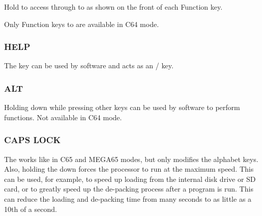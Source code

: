 Hold  to access  through to  as shown on the front of each Function key.

Only Function keys  to  are available in C64 mode.

\subsubsection{HELP}

The  key can be used by software and acts as an  /  key.

\subsubsection{ALT}

Holding  down while pressing other keys can be used by software to perform functions. Not available in C64 mode.

\subsubsection{CAPS LOCK}

The  works like  in C65 and MEGA65 modes, but only modifies the alphabet keys.
Also, holding the  down forces the processor to run at the maximum speed. This can be used, for example,
to speed up loading from the internal disk drive or SD card, or to greatly speed up the de-packing process after a program is run.
This can reduce the loading and de-packing time from many seconds to as little as a 10th of a second.
